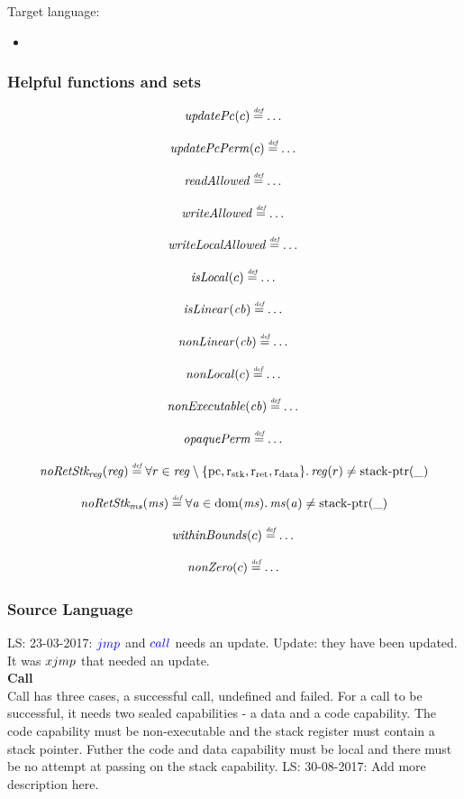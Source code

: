 \documentclass[a4paper]{article}
\newcommand\lau[1]{{\color{purple} \sf \footnotesize {LS: #1}}\\}
\newcommand{\defeq}{\stackrel{\textit{\tiny{def}}}{=}}
\newcommand{\dom}{\mathrm{dom}}
\newcommand{\sourcecolor}[1]{\color{blue}}
\newcommand{\src}[1]{{\sourcecolor{} #1}}
\newcommand{\targetcolor}[1]{\color{black}}
\newcommand{\trg}[1]{{\targetcolor{} #1}}
\newcommand{\zinstr}[1]{#1}
\newcommand{\oneinstr}[2]{
  \ifthenelse{\equal{#2}{}}
  {\zinstr{#1}}
  {\zinstr{#1} \; #2}
}
\newcommand{\twoinstr}[3]{
  \ifthenelse{\equal{#2#3}{}}
  {\zinstr{#1}}
  {\zinstr{#1} \; #2 \; #3}
}
\newcommand{\sjmp}[1]{\oneinstr{\src{jmp}}{#1}}
\newcommand{\scall}[2]{\twoinstr{\src{call}}{#1}{#2}}
\newcommand{\sxjmp}[2]{\twoinstr{\trg{xjmp}}{#1}{#2}}
\newcommand{\stkptr}[1]{\mathrm{stack\text{-}ptr}(#1)}
\newcommand{\var}[1]{\mathit{#1}}
\newcommand{\reg}{\var{reg}}
\newcommand{\ms}{\var{ms}}
\newcommand{\cb}{\var{cb}}
\newcommand{\aaddr}{\var{a}}
\newcommand{\pcreg}{\mathrm{pc}}
\newcommand{\rstk}{\mathrm{r}_\mathrm{stk}}
\newcommand{\rO}{\mathrm{r}_\mathrm{ret}}
\newcommand{\rret}{\rO}
\newcommand{\rdata}{\mathrm{r}_\mathrm{data}}
\newcommand{\plainfun}[2]{
  \ifthenelse{\equal{#2}{}}
  {\mathit{#1}}
  {\mathit{#1}(#2)}
}
\newcommand{\updPcAddr}[1]{\plainfun{updatePc}{#1}}
\newcommand{\updPcPerm}[1]{\plainfun{updatePcPerm}{#1}}
\newcommand{\nonExec}[1]{\plainfun{nonExecutable}{#1}}
\newcommand{\opaquePerm}[1]{\plainfun{opaquePerm}{#1}}
\newcommand{\readAllowed}[1]{\plainfun{readAllowed}{#1}}
\newcommand{\writeAllowed}[1]{\plainfun{writeAllowed}{#1}}
\newcommand{\writeLocalAllowed}[1]{\plainfun{writeLocalAllowed}{#1}}
\newcommand{\nonLoc}[1]{\plainfun{nonLocal}{#1}}
\newcommand{\nonLinear}[1]{\plainfun{nonLinear}{#1}}
\newcommand{\isLoc}[1]{\plainfun{isLocal}{#1}}
\newcommand{\isLinear}[1]{\plainfun{isLinear}{#1}}
\newcommand{\noRetStkReg}[1]{\plainfun{noRetStk_{reg}}{#1}}
\newcommand{\noRetStkMs}[1]{\plainfun{noRetStk_{ms}}{#1}}
\newcommand{\withinBounds}[1]{\plainfun{withinBounds}{#1}}
\newcommand{\nonZero}[1]{\plainfun{nonZero}{#1}}
\begin{document}
Target language:
\begin{itemize}
\item 
\end{itemize}

\subsubsection{Helpful functions and sets}


\[
  \updPcAddr{c} \defeq \dots
\]

\[
  \updPcPerm{c} \defeq \dots
\]

\[
  \readAllowed{} \defeq \dots
\]

\[
  \writeAllowed{} \defeq \dots
\]

\[
  \writeLocalAllowed{} \defeq \dots
\]

\[
  \isLoc{c} \defeq \dots
\]

\[
  \isLinear{\cb} \defeq \dots
\]

\[
  \nonLinear{\cb} \defeq \dots
\]

\[
  \nonLoc{c} \defeq \dots
\]

\[
  \nonExec{\cb} \defeq \dots
\]

\[
  \opaquePerm{} \defeq \dots
\]

\[
  \noRetStkReg{\reg} \defeq \forall r \in \reg \setminus \{ \pcreg, \rstk, \rret, \rdata \} \ldotp \reg(r) \neq \stkptr{\_}
\]

\[
  \noRetStkMs{\ms} \defeq \forall \aaddr \in \dom(\ms) \ldotp \ms(\aaddr) \neq \stkptr{\_}
\]

\[
  \withinBounds{c} \defeq \dots
\]

\[
  \nonZero{c} \defeq \dots
\]


\subsubsection{Source Language}
\label{sec:source-language}
\lau{23-03-2017: $\sjmp{}$ and $\scall{}{}$ needs an update. Update: they have been updated. It was $\sxjmp{}{}$ that needed an update.}

\textbf{Call}\\
Call has three cases, a successful call, undefined and failed. For a call to be successful, it needs two sealed capabilities - a data and a code capability. The code capability must be non-executable and the stack register must contain a stack pointer. Futher the code and data capability must be local and there must be no attempt at passing on the stack capability.
\lau{30-08-2017: Add more description here.}
\end{document}
